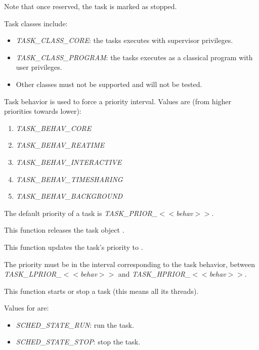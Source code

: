 \begin{itemize}
{	   Note that once reserved, the task is marked as stopped.

	   Task classes include:

	   \begin{itemize}
	     \item
	       \emph{TASK\_CLASS\_CORE}: the tasks executes with
	       supervisor privileges.
	     \item
	       \emph{TASK\_CLASS\_PROGRAM}: the tasks executes as a
	       classical program with user privileges.
	     \item
	       Other classes must not be supported and will not be
	       tested.
	   \end{itemize}

	   Task behavior is used to force a priority interval. Values
	   are (from higher priorities towards lower):

	   \begin{enumerate}
	     \item \emph{TASK\_BEHAV\_CORE}
	     \item \emph{TASK\_BEHAV\_REATIME}
	     \item \emph{TASK\_BEHAV\_INTERACTIVE}
	     \item \emph{TASK\_BEHAV\_TIMESHARING}
	     \item \emph{TASK\_BEHAV\_BACKGROUND}
	   \end{enumerate}

	   The default priority of a task is
	   \emph{TASK\_PRIOR\_$<<$behav$>>$}.
	 }

	 {
	   This function releases the task object .
	 }

	 {
	   This function updates the task's priority to .

	   The priority must be in the interval corresponding to the
	   task behavior, between \emph{TASK\_LPRIOR\_$<<$behav$>>$} and
	   \emph{TASK\_HPRIOR\_$<<$behav$>>$}.
	 }

	 {
	   This function starts or stop a task (this means all its
	   threads).

	   Values for  are:

	   \begin{itemize}
	     \item
	       \emph{SCHED\_STATE\_RUN}: run the task.
	     \item
	       \emph{SCHED\_STATE\_STOP}: stop the task.
	   \end{itemize}
	 }


\end{itemize}
